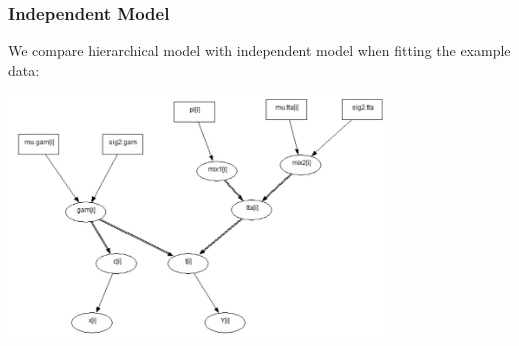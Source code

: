 \documentclass{beamer}[10]
\begin{document}
\begin{frame}
	\frametitle{Independent Model}
	We compare hierarchical model with independent model when fitting the example data:
	\begin{center}
		\includegraphics[width = 10cm]{doodle_ind.jpg}
	\end{center}
\end{frame}
\end{document}
